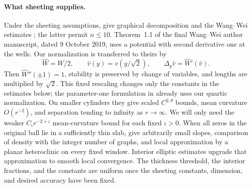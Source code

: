 \paragraph{What sheeting supplies.}
Under the sheeting assumptions, \cite[Lemma~2.13 and Theorem~2.14]{FSS2025}
give graphical decomposition and the Wang--Wei estimates
\cite{WangWei2019}; the latter permit \(n\le10\).
Theorem~1.1 of the final Wang--Wei author manuscript, dated
9 October 2019, uses a potential with second derivative one at the
wells.  Our normalization is transferred to theirs by
\[
 \widehat W=W/2,\qquad \widehat v(y)=v(y/\sqrt2),\qquad
 \Delta_y\widehat v=\widehat W'(\widehat v).
\]
Then \(\widehat W''(\pm1)=1\), stability is preserved by change of
variables, and lengths are multiplied by \(\sqrt2\).
This fixed rescaling changes only the constants in the estimates below;
the parameter-one formulation in \cite[Theorem~2.14]{FSS2025}
already uses our quartic normalization.
On smaller cylinders they give scaled \(C^{2,\theta}\) bounds, mean
curvature \(O(r^{-2})\), and separation tending to infinity as
\(r\to\infty\).  We will only need the weaker
\(C_\iota r^{-2+\iota}\) mean-curvature bound for each fixed \(\iota>0\).
When all zeros in the original ball lie in a sufficiently thin slab,
\cite[Theorem~4.8 and Lemmas~4.9--4.10]{FSS2025} give arbitrarily small
slopes, comparison of density with the integer number of graphs, and
local approximation by a planar heteroclinic on every fixed window.
Interior elliptic estimates upgrade that approximation to smooth local
convergence.  The thickness threshold, the interior fractions, and the
constants are uniform once the sheeting constants, dimension, and desired
accuracy have been fixed.

